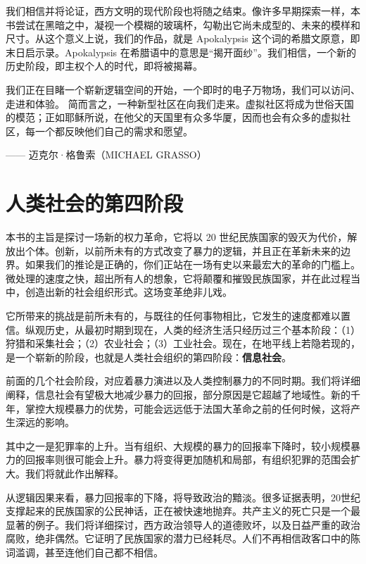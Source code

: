 我们相信并将论证，西方文明的现代阶段也将随之结束。像许多早期探索一样，本书尝试在黑暗之中，凝视一个模糊的玻璃杯，勾勒出它尚未成型的、未来的模样和尺寸。从这个意义上说，我们的作品，就是 Apokalypsis 这个词的希腊文原意，即末日启示录。Apokalypsis 在希腊语中的意思是“揭开面纱”。我们相信，一个新的历史阶段，即主权个人的时代，即将被揭幕。


\begin{tcolorbox}
我们正在目睹一个崭新逻辑空间的开始，一个即时的电子万物场，我们可以访问、走进和体验。
简而言之，一种新型社区在向我们走来。虚拟社区将成为世俗天国的模范；正如耶稣所说，在他父的天国里有众多华厦，因而也会有众多的虚拟社区，每一个都反映他们自己的需求和愿望。
\begin{flushright}
—— 迈克尔·格鲁索（MICHAEL GRASSO）
\end{flushright}
\end{tcolorbox}

\section{人类社会的第四阶段}
本书的主旨是探讨一场新的权力革命，它将以 20 世纪民族国家的毁灭为代价，解放出个体。创新，以前所未有的方式改变了暴力的逻辑，并且正在革新未来的边界。如果我们的推论是正确的，你们正站在一场有史以来最宏大的革命的门槛上。微处理的速度之快，超出所有人的想象，它将颠覆和摧毁民族国家，并在此过程当中，创造出新的社会组织形式。这场变革绝非儿戏。


它所带来的挑战是前所未有的，与既往的任何事物相比，它发生的速度都难以置信。纵观历史，从最初时期到现在，人类的经济生活只经历过三个基本阶段：（1）狩猎和采集社会；（2）农业社会；（3）工业社会。现在，在地平线上若隐若现的，是一个崭新的阶段，也就是人类社会组织的第四阶段：\textbf{信息社会}。


前面的几个社会阶段，对应着暴力演进以及人类控制暴力的不同时期。我们将详细阐释，信息社会有望极大地减少暴力的回报，部分原因是它超越了地域性。新的千年，掌控大规模暴力的优势，可能会远远低于法国大革命之前的任何时候，这将产生深远的影响。

其中之一是犯罪率的上升。当有组织、大规模的暴力的回报率下降时，较小规模暴力的回报率则很可能会上升。暴力将变得更加随机和局部，有组织犯罪的范围会扩大。我们将就此作出解释。

从逻辑因果来看，暴力回报率的下降，将导致政治的黯淡。很多证据表明，20世纪支撑起来的民族国家的公民神话，正在被快速地抛弃。共产主义的死亡只是一个最显著的例子。我们将详细探讨，西方政治领导人的道德败坏，以及日益严重的政治腐败，绝非偶然。它证明了民族国家的潜力已经耗尽。人们不再相信政客口中的陈词滥调，甚至连他们自己都不相信。

